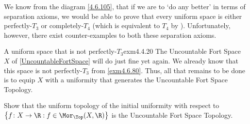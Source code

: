 We know from the diagram \eqref{4.6.105}, that if we are to `do any better' in terms of separation axioms, we would be able to prove that every uniform space is either perfectly-$T_3$ or completely-$T_4$ (which is equivalent to $T_4$ by ).  Unfortunately, however, there exist counter-examples to both these separation axioms.
\begin{exm}{A uniform space that is not perfectly-$T_3$}{exm4.4.20}
The Uncountable Fort Space $X$ of \cref{UncountableFortSpace} will do just fine yet again.  We already know that this space is not perfectly-$T_3$ from \cref{exm4.6.80}.  Thus, all that remains to be done is to equip $X$ with a uniformity that generates the Uncountable Fort Space Topology.
\begin{exr}[breakable=false]{}{}
Show that the uniform topology of the initial uniformity with respect to $\left\{ f\colon X\rightarrow \R :f\in \Mor _{\Top}(X,\R )\right\}$ is the Uncountable Fort Space Topology.
\end{exr}
\end{exm}
